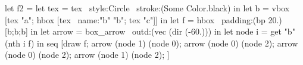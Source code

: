 let f2 =
  let tex = tex ~style:Circle ~stroke:(Some Color.black) in
  let b = vbox [tex "a"; hbox [tex ~name:"b" "b"; tex "c"]] in
  let f = hbox ~padding:(bp 20.) [b;b;b] in
  let arrow = box_arrow ~outd:(vec (dir (-60.))) in
  let node i = get "b" (nth i f) in
  seq [draw f;
       arrow (node 1) (node 0);
       arrow (node 0) (node 2);
       arrow (node 0)  (node 2);
       arrow (node 1) (node 2);
      ]
